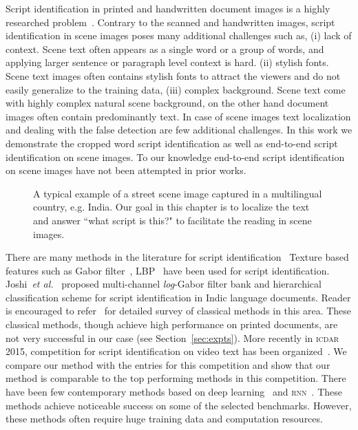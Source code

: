 Script identification in printed and handwritten document
images is a highly researched problem~\cite{GhoshDS10,scriptICDAR15,Pal}. Contrary to the scanned and handwritten images, script identification in scene images poses many additional challenges such as, (i) lack of context. Scene text often appears as a single word or a group of words, and applying larger sentence or paragraph level context is hard. (ii) stylish fonts. Scene text images often contains stylish fonts to attract the viewers and do not easily generalize to the training data, (iii) complex background. Scene text come with highly complex natural scene background, on the other hand document images often contain predominantly text. In case of scene images text localization and dealing with the false detection are few additional challenges. In this work we demonstrate the cropped word script identification as well as end-to-end script identification on scene images. To our knowledge end-to-end script identification on scene images have not been attempted in prior works.
\begin{figure} [!t]
\centering
{}
\caption{A typical example of a street scene image captured in a multilingual country, e.g. India. Our goal in this chapter is to localize the text and answer ``what script is this?" to facilitate the reading in scene images.}
\label{fig:firstRes}
\end{figure} 

There are many methods in the literature for script identification~\cite{CVSIComp,GhoshDS10,PhanSDLT11,JoshiGS07,Pati,SIWIcdar}
Texture based features such as Gabor filter~\cite{Pati}, \textsc{LBP}~\cite{LBPOjala2002} have been used for script identification. Joshi~\textit{et al.}~\cite{JoshiGS07} proposed multi-channel \textit{log}-Gabor filter bank and hierarchical classification scheme for script identification in Indic language documents. Reader is encouraged to refer~\cite{GhoshDS10} for detailed survey of classical methods in this area. 
These classical methods, though achieve high performance on printed documents, are not very successful in our case (see Section~\ref{sec:expts}). More recently in \textsc{icdar} 2015, competition for script identification on video text has been organized~\cite{CVSIComp}. We compare our method with the entries for this competition and show that our method is comparable to the top performing methods in this competition. There have been few contemporary methods based on deep learning~\cite{SIWIcdar,CVSIComp} and \textsc{rnn}~\cite{scriptICDAR15}. These methods achieve noticeable success on some of the selected benchmarks. However, these methods often require huge training data and computation resources.
 
